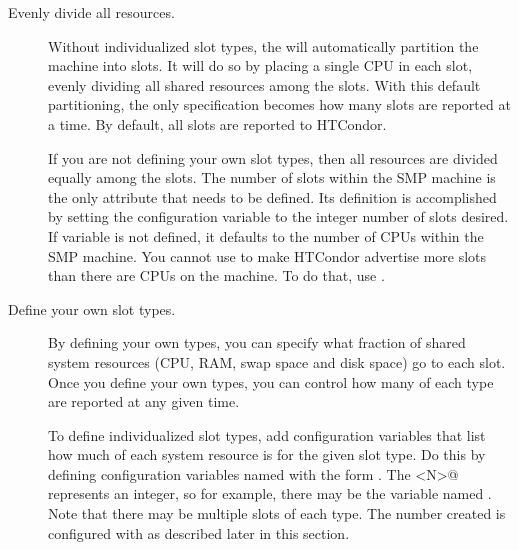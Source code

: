 \begin{description}

\item[Evenly divide all resources.]  
  Without individualized slot types, the  will
  automatically	partition the machine into slots.
  It will do so by placing a single CPU in each slot, 
  evenly dividing all shared resources among the slots.
  With this default partitioning, the only specification becomes how many
  slots are reported at a time.
  By default, all slots are reported to HTCondor.

  If you are not defining your own slot types, then all resources
  are divided equally among the slots.
  The number of slots within the SMP machine is the only attribute
  that needs to be defined.
  Its definition is accomplished by setting the configuration
  variable  to the
  integer number of slots desired.
  If variable  is not defined,
  it defaults to the number of CPUs within the SMP machine.
  You cannot use  to make HTCondor advertise more
  slots than there are CPUs on the machine.
  To do that, use .

\item[Define your own slot types.]
  By defining your own types, you can specify what fraction of shared
  system resources (CPU, RAM, swap space and disk space) go to each
  slot.
  Once you define your own types, you can control how many of each
  type are reported at any given time.



To define individualized slot types, add configuration variables
that list how much of each system resource is for the given slot type.
Do this by defining configuration variables named with the form
.
The \verb@<N>@ represents an integer,
so for example, there may be the variable named .
Note that there may be multiple slots of each type.  The number created
is configured with  as described later in
this section.


\end{description}
